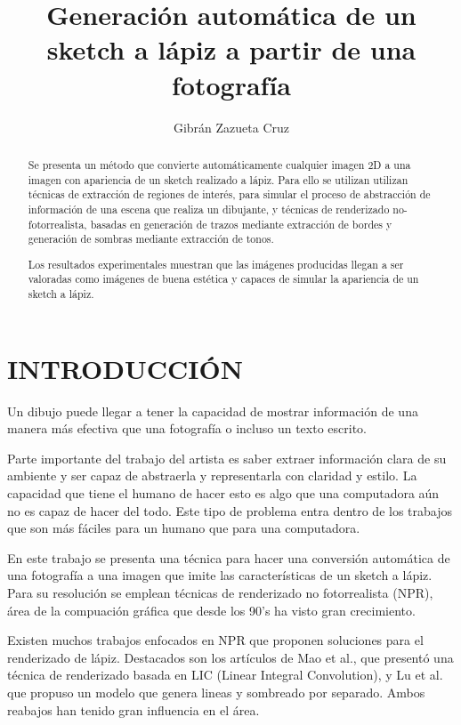 \documentclass[letterpaper, 10 pt, conference]{ieeeconf}  %
\title{\LARGE \bf
Generación automática de un sketch a lápiz a partir de una fotografía
}
\author{Gibrán Zazueta Cruz}
\begin{document}
\maketitle
\thispagestyle{empty}
\pagestyle{empty}


\begin{abstract}
Se presenta un método que convierte automáticamente cualquier imagen 2D a una imagen con apariencia de un sketch realizado a lápiz. Para ello se utilizan utilizan técnicas de extracción de regiones de interés, para simular el proceso de abstracción de información de una escena que realiza un dibujante, y técnicas de renderizado no-fotorrealista, basadas en generación de trazos mediante extracción de bordes y generación de sombras mediante extracción de tonos.

Los resultados experimentales muestran que las imágenes producidas llegan a ser valoradas como imágenes de buena estética y capaces de simular la apariencia de un sketch a lápiz.
\end{abstract}


\section{INTRODUCCIÓN}

Un dibujo puede llegar a tener la capacidad de mostrar información de una manera más efectiva que una fotografía o incluso un texto escrito.

Parte importante del trabajo del artista es saber extraer información clara de su ambiente y ser capaz de abstraerla y representarla con claridad y estilo. La capacidad que tiene el humano de hacer esto es algo que una computadora aún no es capaz de hacer del todo. Este tipo de problema entra dentro de los  trabajos que son más fáciles para un humano que para una computadora.

En este trabajo se presenta una técnica para hacer una conversión automática de una fotografía a una imagen que imite las características de un sketch a lápiz. Para su resolución se emplean técnicas de renderizado no fotorrealista (NPR), área de la compuación gráfica que desde los 90's ha visto gran crecimiento.

Existen muchos trabajos enfocados en NPR que proponen soluciones para el renderizado de lápiz. Destacados son los artículos de Mao et al.\cite{mao}, que presentó una técnica de renderizado basada en LIC (Linear Integral Convolution), y Lu et al.\cite{lu} que propuso un modelo que genera lineas y sombreado por separado. Ambos reabajos han tenido gran influencia en el área.
\end{document}
